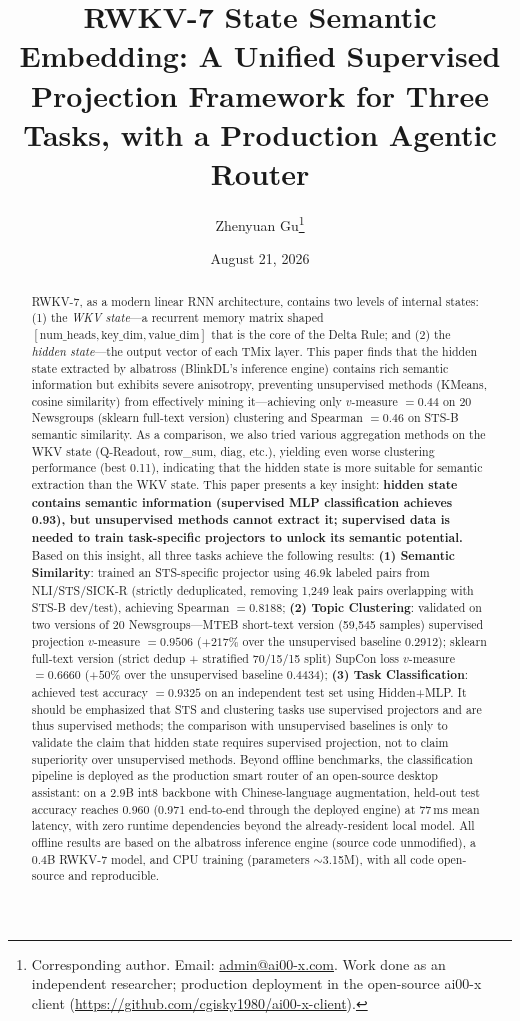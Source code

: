 \documentclass[11pt]{article}
\title{RWKV-7 State Semantic Embedding: A Unified Supervised Projection
Framework for Three Tasks, with a Production Agentic Router}
\author{Zhenyuan Gu\thanks{Corresponding author. Email:
\url{admin@ai00-x.com}. Work done as an independent researcher; production
deployment in the open-source ai00-x client
(\url{https://github.com/cgisky1980/ai00-x-client}).}}
\date{August 21, 2026}
\begin{document}
\maketitle

\begin{abstract}
RWKV-7, as a modern linear RNN architecture, contains two levels of internal
states: (1) the \emph{WKV state}---a recurrent memory matrix shaped
$[\text{num\_heads}, \text{key\_dim}, \text{value\_dim}]$ that is the core of
the Delta Rule; and (2) the \emph{hidden state}---the output vector of each
TMix layer. This paper finds that the hidden state extracted by albatross
(BlinkDL's inference engine) contains rich semantic information but exhibits
severe anisotropy, preventing unsupervised methods (KMeans, cosine similarity)
from effectively mining it---achieving only $v$-measure $=0.44$ on 20
Newsgroups (sklearn full-text version) clustering and Spearman $=0.46$ on
STS-B semantic similarity. As a comparison, we also tried various aggregation
methods on the WKV state (Q-Readout, row\_sum, diag, etc.), yielding even
worse clustering performance (best 0.11), indicating that the hidden state is
more suitable for semantic extraction than the WKV state. This paper presents
a key insight: \textbf{hidden state contains semantic information
(supervised MLP classification achieves 0.93), but unsupervised methods
cannot extract it; supervised data is needed to train task-specific
projectors to unlock its semantic potential.} Based on this insight, all
three tasks achieve the following results: \textbf{(1) Semantic Similarity}:
trained an STS-specific projector using 46.9k labeled pairs from
NLI/STS/SICK-R (strictly deduplicated, removing 1,249 leak pairs overlapping
with STS-B dev/test), achieving Spearman $=0.8188$; \textbf{(2) Topic
Clustering}: validated on two versions of 20 Newsgroups---MTEB short-text
version (59,545 samples) supervised projection $v$-measure $=0.9506$ ($+217\%$
over the unsupervised baseline 0.2912); sklearn full-text version (strict
dedup + stratified 70/15/15 split) SupCon loss $v$-measure $=0.6660$ ($+50\%$
over the unsupervised baseline 0.4434); \textbf{(3) Task Classification}:
achieved test accuracy $=0.9325$ on an independent test set using
Hidden+MLP. It should be emphasized that STS and clustering tasks use
supervised projectors and are thus supervised methods; the comparison with
unsupervised baselines is only to validate the claim that hidden state
requires supervised projection, not to claim superiority over unsupervised
methods. Beyond offline benchmarks, the classification pipeline is deployed
as the production smart router of an open-source desktop assistant: on a 2.9B
int8 backbone with Chinese-language augmentation, held-out test accuracy
reaches 0.960 (0.971 end-to-end through the deployed engine) at 77\,ms mean
latency, with zero runtime dependencies beyond the already-resident local
model. All offline results are based on the albatross inference engine
(source code unmodified), a 0.4B RWKV-7 model, and CPU training (parameters
$\sim$3.15M), with all code open-source and reproducible.
\end{abstract}
\end{document}
